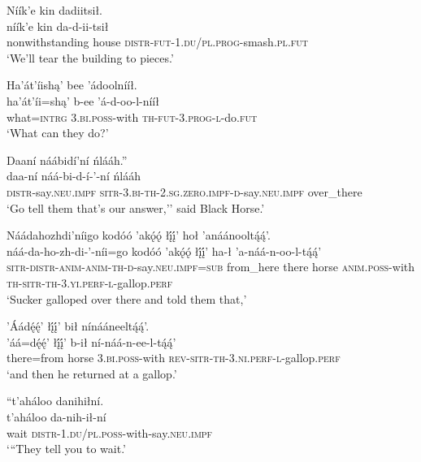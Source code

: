 \ea\label{ex:text1-54-2}
Níík’e kin dadiitsił.\\
\gll níík’e	kin	da-d-ii-tsił\\
     nonwithstanding	house	\textsc{distr}-\textsc{fut}-1.\textsc{du}/\textsc{pl}.\textsc{prog}-smash.\textsc{pl}.\textsc{fut}\\
\glt `We'll tear the building to pieces.'
\z

\ea\label{ex:text1-54-3}
Ha’át’íishą’ bee ’ádoolnííł.\\
\gll ha’át’íi=shą’	b-ee	’á-d-oo-l-nííł\\
     what=\textsc{intrg}	3.\textsc{bi}.\textsc{poss}-with	\textsc{th}-\textsc{fut}-3.\textsc{prog}-\textsc{l}-do.\textsc{fut}\\
\glt `What can they do?'
\z

\ea\label{ex:text1-54-4}
Daaní náábidí’ní ńlááh.''\\
\gll daa-ní	náá-bi-d-í-’-ní	ńlááh\\
     \textsc{distr}-say.\textsc{neu}.\textsc{impf}	\textsc{sitr}-3.\textsc{bi}-\textsc{th}-2.\textsc{sg}.\textsc{zero}.\textsc{impf}-\textsc{d}-say.\textsc{neu}.\textsc{impf}	over\_there\\
\glt `Go tell them that's our answer,'' said Black Horse.'
\z

\ea\label{ex:text1-55-1}
Náádahozhdi’níigo kodóó ’akǫ́ǫ́ łį́į́’ hoł ’anáánooltą́ą́’.\\
\gll náá-da-ho-zh-di-’-níi=go	kodóó	’akǫ́ǫ́	łį́į́’	ha-ł	’a-náá-n-oo-l-tą́ą́’\\
     \textsc{sitr}-\textsc{distr}-\textsc{anim}-\textsc{anim}-\textsc{th}-\textsc{d}-say.\textsc{neu}.\textsc{impf}=\textsc{sub}	from\_here	there	horse	\textsc{anim}.\textsc{poss}-with	\textsc{th}-\textsc{sitr}-\textsc{th}-3.\textsc{yi}.\textsc{perf}-\textsc{l}-gallop.\textsc{perf}\\
\glt `Sucker galloped over there and told them that,'
\z

\ea\label{ex:text1-55-2}
’Áádę́ę́’ łį́į́’ bił nínááneeltą́ą́’.\\
\gll ’áá=dę́ę́’	łį́į́’	b-ił	ní-náá-n-ee-l-tą́ą́’\\
     there=from	horse	3.\textsc{bi}.\textsc{poss}-with	\textsc{rev}-\textsc{sitr}-\textsc{th}-3.\textsc{ni}.\textsc{perf}-\textsc{l}-gallop.\textsc{perf}\\
\glt `and then he returned at a gallop.'
\z

\ea\label{ex:text1-56-1}
``t’aháloo danihiłní.\\
\gll t’aháloo	da-nih-ił-ní\\
     wait	\textsc{distr}-1.\textsc{du}/\textsc{pl}.\textsc{poss}-with-say.\textsc{neu}.\textsc{impf}\\
\glt `{``}They tell you to wait.'
\z

